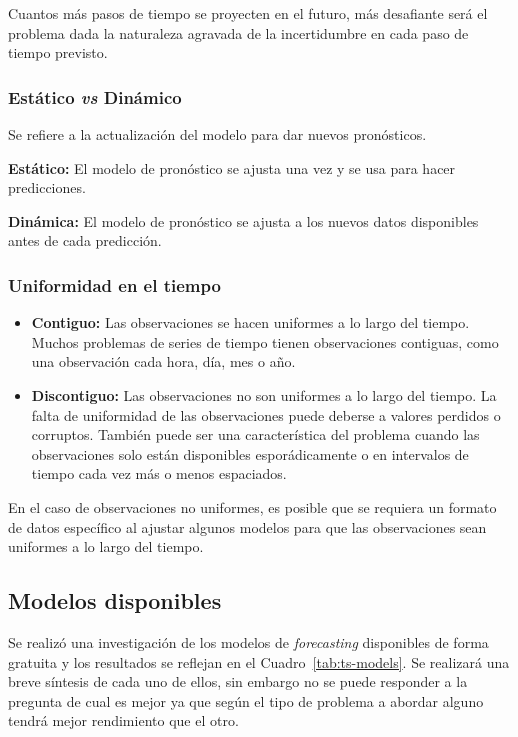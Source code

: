 \documentclass[a4paper,12pt]{article}
\begin{document}
Cuantos más pasos de tiempo se proyecten en el futuro, más desafiante será el problema dada la naturaleza agravada de la incertidumbre en cada paso de tiempo previsto.

\subsubsection{Estático \textit{vs} Dinámico}
Se refiere a la actualización del modelo para dar nuevos pronósticos.

\textbf{Estático:} El modelo de pronóstico se ajusta una vez y se usa para hacer predicciones.

\textbf{Dinámica:} El modelo de pronóstico se ajusta a los nuevos datos disponibles antes de cada predicción.

\subsubsection{Uniformidad en el tiempo}

\begin{itemize}
	\item \textbf{Contiguo:} Las observaciones se hacen uniformes a lo largo del tiempo. Muchos problemas de series de tiempo tienen observaciones contiguas, como una observación cada hora, día, mes o año.
	\item \textbf{Discontiguo:} Las observaciones no son uniformes a lo largo del tiempo. La falta de uniformidad de las observaciones puede deberse a valores perdidos o corruptos. También puede ser una característica del problema cuando las observaciones solo están disponibles esporádicamente o en intervalos de tiempo cada vez más o menos espaciados.
\end{itemize}

En el caso de observaciones no uniformes, es posible que se requiera un formato de datos específico al ajustar algunos modelos para que las observaciones sean uniformes a lo largo del tiempo.

\subsection{Modelos disponibles}

Se realizó una investigación de los modelos de \textit{forecasting} disponibles de forma gratuita y los resultados se reflejan en el Cuadro~\ref{tab:ts-models}. Se realizará una breve síntesis de cada uno de ellos, sin embargo no se puede responder a la pregunta de cual es mejor ya que según el tipo de problema a abordar alguno tendrá mejor rendimiento que el otro.
\end{document}
